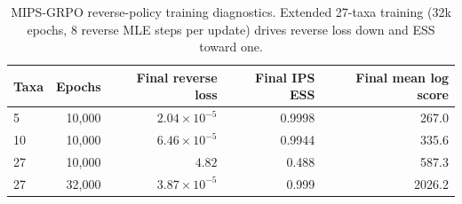 \begin{table}[htbp]
\centering
\caption{MIPS-GRPO reverse-policy training diagnostics. Extended 27-taxa training
(32k epochs, 8 reverse MLE steps per update) drives reverse loss down and ESS
toward one.}
\label{tab:reverse-training}
\begin{tabular}{lrrrr}
\toprule
Taxa & Epochs & Final reverse loss & Final IPS ESS & Final mean log score \\
\midrule
5  & 10{,}000 & $2.04\times10^{-5}$ & 0.9998 & 267.0 \\
10 & 10{,}000 & $6.46\times10^{-5}$ & 0.9944 & 335.6 \\
27 & 10{,}000 & $4.82$              & 0.488  & 587.3 \\
27 & 32{,}000 & $3.87\times10^{-5}$ & 0.999  & 2026.2 \\
\bottomrule
\end{tabular}
\end{table}
